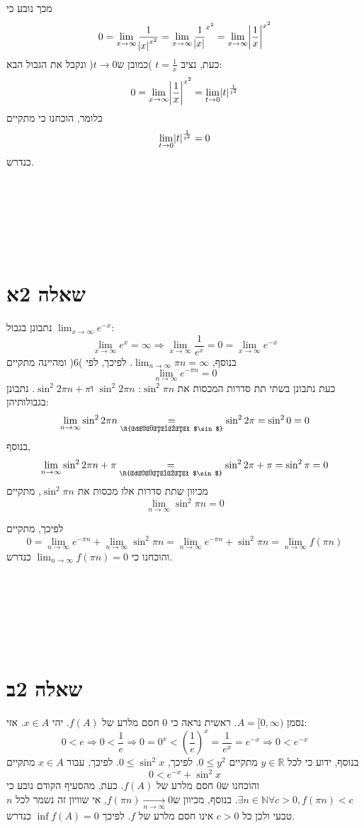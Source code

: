 \documentclass[11pt, oneside]{article}
\newcommand{\qed}{\R{$\blacksquare$}}
\newcommand{\br}{\\\\\\\\\\\\\\}
\newcommand{\opr}[1]{\xrightarrow[\text{#1}]{}}
\newcommand{\logr}{\Longrightarrow}
\newcommand{\ueq}[1]{\underset{\text{#1}}{=}}
\newcommand{\mR}{\mathbb{R}}
\newcommand{\mN}{\mathbb{N}}
\begin{document}
מכך נובע כי
\[
0 = \lim_{x \to \infty} \frac{1}{\abs{x}^{x^{2}}}
= \lim_{x \to \infty} \frac{1}{\abs{x}}^{x^{2}}
= \lim_{x \to \infty} \abs{\frac{1}{x}}^{x^{2}}
\]
כעת, נציב $t = \frac{1}{x}$ )כמובן ש$t \to 0$( ונקבל את הגבול הבא:
\[
0 = \lim_{x \to \infty} \abs{\frac{1}{x}}^{x^{2}}
= \lim_{t \to 0} \abs{t}^{\frac{1}{t^{2}}}
\]
כלומר, הוכחנו כי מתקיים
\[
\lim_{t \to 0} \abs{t}^{\frac{1}{t^{2}}} = 0
\]
כנדרש.
\br\qed
\clearpage

\section*{שאלה 2א}
נתבונן בגבול $\lim_{x \to \infty} e^{-x}$:
\begin{equation}
\lim_{x \to \infty} e^{x} = \infty \logr \lim_{x \to \infty} \frac{1}{e^{x}} = 0 = \lim_{x \to \infty} e^{-x}
\end{equation}
בנוסף, $\lim_{n \to \infty} \pi n = \infty$. לפיכך, לפי )6( ומהיינה מתקיים
\[
\lim_{n \to \infty} e^{-\pi n} = 0
\]
כעת נתבונן בשתי תת סדרות המכסות את $\sin^{2}{\pi n}$: $\sin^{2}{2\pi n}$ ו$\sin^{2}{2\pi n + \pi}$. נתבונן בגבולותיהן:
\[
\lim_{n \to \infty} \sin^{2}{2\pi n} \ueq{\R{מחזוריות $\sin$}} \sin^{2}{2\pi} = \sin^{2}{0} = 0
\]
בנוסף,
\[
\lim_{n \to \infty} \sin^{2}{2\pi n + \pi} \ueq{\R{מחזוריות $\sin$}} \sin^{2}{2\pi + \pi} = \sin^{2}{\pi} = 0
\]
מכיוון שתת סדרות אלו מכסות את $\sin^{2}{\pi n}$, מתקיים
\[
\lim_{n \to \infty} \sin^{2}{\pi n} = 0
\]

לפיכך, מתקיים
\[
0 = \lim_{n \to \infty} e^{-\pi n} + \lim_{n \to \infty} \sin^{2}{\pi n} = \lim_{n \to \infty} e^{-\pi n} + \sin^{2}{\pi n} = \lim_{n \to \infty} f(\pi n)
\]
והוכחנו כי $\lim_{n \to \infty} f(\pi n) = 0$ כנדרש.
\br\qed
\clearpage

\section*{שאלה 2ב}
נסמן $A = [0, \infty)$. ראשית נראה כי 0 חסם מלרע של $f(A)$. יהי $x \in A$. אזי:
\[
0 < e \logr 0 < \frac{1}{e} \logr 0 = 0^{x} < \left(\frac{1}{e}\right)^{x} = \frac{1}{e^{x}} = e^{-x} \logr 0 < e^{-x}
\]
בנוסף, ידוע כי לכל $y \in \mR$ מתקיים $0 \le y^{2}$. לפיכך, $0 \le \sin^{2}{x}$. לפיכך, עבור $x \in A$ מתקיים
\[
0 < e^{-x} + \sin^{2}{x}
\]
והוכחנו ש0 חסם מלרע של $f(A)$. כעת, מהסעיף הקודם נובע כי $\exists n \in \mN \forall c > 0, f(\pi n) < c$. בנוסף, מכיוון ש$f(\pi n) \opr{$n \to \infty$} 0$, אי שוויון זה נשמר לכל $n$ טבעי ולכן כל $c > 0$ אינו חסם מלרע של $f$. לפיכך $\inf f(A) = 0$ כנדרש.
\br\qed
\end{document}
